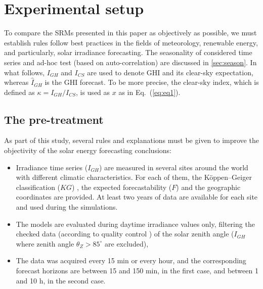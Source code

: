 \section{Experimental setup}
\label{sec:experiment}
To compare the SRMs presented in this paper as objectively as possible, we must establish rules follow best practices in the fields of meteorology, renewable energy, and particularly, solar irradiance forecasting. The seasonality of considered time series and ad-hoc test (based on auto-correlation) are discussed in \ref{sec:season}. In what follows, $I_{GH}$ and $I_{CS}$ are used to denote GHI and its clear-sky expectation, whereas $\widehat{I}_{GH}$ is the GHI forecast. To be more precise, the clear-sky index, which is defined as $\kappa=I_{GH}/I_{CS}$, is used as $x$ as in Eq.~(\ref{eq:eq1}).

\subsection{The pre-treatment}
\label{sec:pre}
As part of this study, several rules and explanations must be given to improve the objectivity of the solar energy forecasting conclusions:
\begin{itemize}[label=$\looparrowright$]
\item Irradiance time series ($I_{GH}$) are measured in several sites around the world with different climatic characteristics. For each of them, the K\"oppen--Geiger classification ($KG$) \citep{ASCENCIOVASQUEZ2019672}, the expected forecastability ($F$) \citep {doi:10.1063/5.0042710} and the geographic coordinates are provided. At least two years of data are available for each site and used during the simulations.
\item  The models are evaluated during daytime irradiance values only, filtering the checked data (according to quality control \citep{espinar_quality_2012,articleCQ}) of the solar zenith angle ($I_{GH}$ where zenith angle $\theta_Z>85^\circ$ are excluded),
\item The data was acquired every 15 min or every hour, and the corresponding forecast horizons are between 15 and 150 min, in the first case, and between 1 and 10 h, in the second case. 
\end{itemize}

